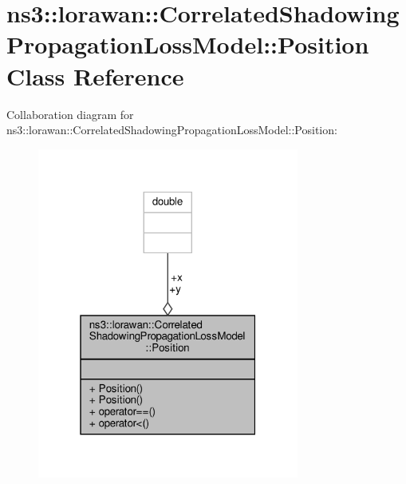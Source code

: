 \hypertarget{classns3_1_1lorawan_1_1CorrelatedShadowingPropagationLossModel_1_1Position}{}\section{ns3\+:\+:lorawan\+:\+:Correlated\+Shadowing\+Propagation\+Loss\+Model\+:\+:Position Class Reference}
\label{classns3_1_1lorawan_1_1CorrelatedShadowingPropagationLossModel_1_1Position}


Collaboration diagram for ns3\+:\+:lorawan\+:\+:Correlated\+Shadowing\+Propagation\+Loss\+Model\+:\+:Position\+:
\nopagebreak
\begin{figure}[H]
\begin{center}
\leavevmode
\includegraphics[width=244pt]{classns3_1_1lorawan_1_1CorrelatedShadowingPropagationLossModel_1_1Position__coll__graph}
\end{center}
\end{figure}
